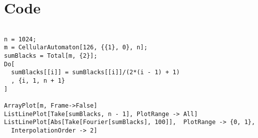 \appendix
\section{Code}

\begin{verbatim}

n = 1024;
m = CellularAutomaton[126, {{1}, 0}, n];
sumBlacks = Total[m, {2}]; 
Do[
  sumBlacks[[i]] = sumBlacks[[i]]/(2*(i - 1) + 1)
  , {i, 1, n + 1}
]

ArrayPlot[m, Frame->False]
ListLinePlot[Take[sumBlacks, n - 1], PlotRange -> All]
ListLinePlot[Abs[Take[Fourier[sumBlacks], 100]],  PlotRange -> {0, 1},
  InterpolationOrder -> 2]


\end{verbatim}

